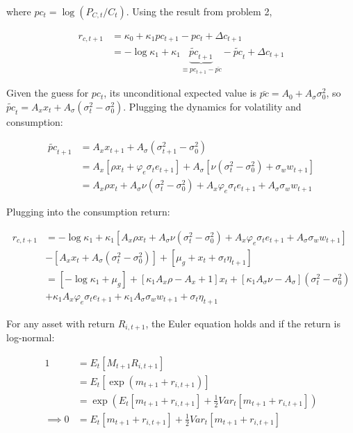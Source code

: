 \documentclass{article}
\begin{document}
\begin{enumerate}
where $pc_t = \log(P_{C,t}/C_{t})$. Using the result from problem 2,

\begin{align*}
r_{c, t+1} 
&= \kappa_0 + \kappa_1 pc_{t+1} - pc_t + \Delta c_{t+1}\\
&= -\log \kappa_1 + \kappa_1 \underbrace{\tilde{pc}_{t+1}}_{\equiv pc_{t+1} - \bar{pc}} - \tilde{pc}_t + \Delta c_{t+1}
\end{align*}

Given the guess for $pc_t$, its unconditional expected value is $\bar{pc} = A_0 + A_\sigma \sigma_0^2$, so $\tilde{pc}_t = A_x x_t + A_\sigma (\sigma_t^2 - \sigma_0^2)$.  Plugging the dynamics for volatility and consumption:

\begin{align*}
\tilde{pc}_{t+1} 
&= A_x x_{t+1} + A_\sigma (\sigma_{t+1}^2 - \sigma_0^2)\\
&= A_x [\rho x_t + \varphi_e \sigma_t e_{t+1}] + A_\sigma [\nu(\sigma_t^2 - \sigma_0^2) + \sigma_w w_{t+1}]\\
&= A_x \rho x_t + A_\sigma \nu(\sigma_t^2 - \sigma_0^2) + A_x \varphi_e \sigma_t e_{t+1}  + A_\sigma \sigma_w w_{t+1}
\end{align*}

Plugging into the consumption return:

\begin{align*}
r_{c, t+1} 
&= -\log \kappa_1 + \kappa_1 [A_x \rho x_t + A_\sigma \nu(\sigma_t^2 - \sigma_0^2) + A_x \varphi_e \sigma_t e_{t+1}  + A_\sigma \sigma_w w_{t+1}] \\&- [A_x x_t + A_\sigma (\sigma_t^2 - \sigma_0^2)] + [\mu_g + x_t + \sigma_t \eta_{t+1}]\\
&= [-\log \kappa_1 + \mu_g] + [\kappa_1 A_x \rho - A_x + 1] x_t
+ [\kappa_1 A_\sigma \nu - A_\sigma](\sigma_t^2 - \sigma_0^2) \\
&+ \kappa_1 A_x \varphi_e \sigma_t e_{t+1} 
+ \kappa_1 A_\sigma \sigma_w w_{t+1}
+ \sigma_t \eta_{t+1}
\end{align*}


For any asset with return $R_{i,t+1}$, the Euler equation holds and if the return is log-normal:

\begin{align*}
1 &= E_t[M_{t+1} R_{i,t+1}]\\
&= E_t[\exp(m_{t+1} + r_{i,t+1})]\\
&= \exp(E_t[m_{t+1} + r_{i,t+1}] + \frac{1}{2} Var_t[m_{t+1} + r_{i,t+1}])\\
\implies
0&= E_t[m_{t+1} + r_{i,t+1}] + \frac{1}{2} Var_t[m_{t+1} + r_{i,t+1}]
\end{align*}


\end{enumerate}
\end{document}
